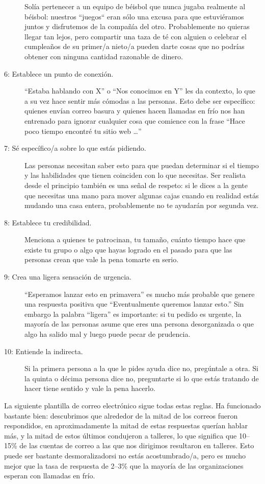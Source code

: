 \begin{description}
Solía pertenecer a un equipo de béisbol que nunca jugaba realmente al béisbol:
nuestros ``juegos`` eran sólo una excusa para que estuviéramos juntos y disfrutemos de la compañía del otro.
Probablemente no quieras llegar tan lejos,
pero compartir una taza de té con alguien o celebrar el cumpleaños de su primer/a nieto/a
pueden darte cosas que no podrías obtener con ninguna cantidad razonable de dinero.
\item[6: Establece un punto de conexión.]
“Estaba hablando con X” o “Nos conocimos en Y” les da contexto,
lo que a su vez hace sentir más cómodas a las personas.
Esto debe ser específico:
quienes envían correo basura y quienes hacen llamadas en frío
nos han entrenado para ignorar cualquier cosa que comience con la frase
“Hace poco tiempo encontré tu sitio web {\ldots}''

\item[7: Sé específico/a sobre lo que estás pidiendo.]

Las personas necesitan saber esto
para que puedan determinar si el tiempo y las habilidades que tienen
coinciden con lo que necesitas.
Ser realista desde el principio también es una señal de respeto:
 si le dices a la gente que necesitas una mano para  mover algunas cajas cuando en realidad estás mudando una casa entera,
 probablemente no te ayudarán por segunda vez.

\item[8: Establece tu credibilidad.]
Menciona a quienes te patrocinan,
tu tamaño,
cuánto tiempo hace que existe tu grupo o algo que hayas logrado en el pasado
para que las personas crean que vale la pena tomarte en serio.

\item[9: Crea una ligera sensación de urgencia.]
“Esperamos lanzar esto en primavera” es mucho más probable que genere una respuesta positiva que “Eventualmente queremos lanzar esto.”
Sin embargo la palabra “ligera” es importante:
si tu pedido es urgente, 
la mayoría de las personas asume que eres una persona desorganizada o que algo ha salido mal
y luego puede pecar de prudencia.

\item[10: Entiende la indirecta.]
Si la primera persona a la que le pides ayuda dice no,
pregúntale a otra.
Si la quinta o décima persona dice no,
preguntarte si lo que estás tratando de hacer tiene sentido y vale la pena hacerlo.
\end{description}

La siguiente plantilla de correo electrónico sigue todas estas reglas.
Ha funcionado bastante bien:
descubrimos que alrededor de la mitad de los correos fueron respondidos, en
aproximadamente  la mitad de estas respuestas querían hablar más,
y la mitad de estos últimos condujeron a talleres,
lo que significa que 10--15\% de las cuentas de correo a las que nos dirigimos resultaron en talleres.
Esto puede ser bastante desmoralizadorsi no estás acostumbrado/a, 
pero es mucho mejor que la tasa de respuesta de 2--3\% que la mayoría de las organizaciones esperan con llamadas en frío.

